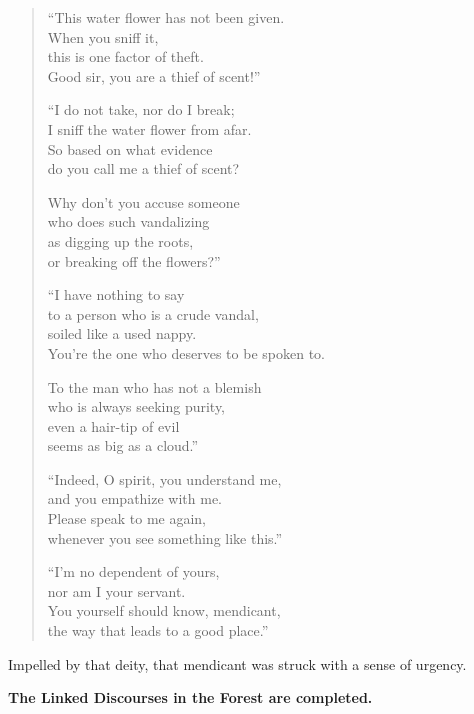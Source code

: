 \documentclass[12pt,openany]{book}%
\let\oldcontentsline\contentsline
\newcommand{\nopagecontentsline}[3]{\oldcontentsline{#1}{#2}{}}
\newcommand*{\scendkanda}[1]{\begin{Center}\textbf{#1}\end{Center}\addvspace{1em}} %
\begin{document}
\begin{verse}%
“This water flower has not been given. \\
When you sniff it, \\
this is one factor of theft. \\
Good sir, you are a thief of scent!” 

“I do not take, nor do I break; \\
I sniff the water flower from afar. \\
So based on what evidence \\
do you call me a thief of scent? 

Why don’t you accuse someone \\
who does such vandalizing \\
as digging up the roots, \\
or breaking off the flowers?” 

“I have nothing to say \\
to a person who is a crude vandal, \\
soiled like a used nappy. \\
You’re the one who deserves to be spoken to. 

To the man who has not a blemish \\
who is always seeking purity, \\
even a hair-tip of evil \\
seems as big as a cloud.” 

“Indeed, O spirit, you understand me, \\
and you empathize with me. \\
Please speak to me again, \\
whenever you see something like this.” 

“I’m no dependent of yours, \\
nor am I your servant. \\
You yourself should know, mendicant, \\
the way that leads to a good place.” 

%
\end{verse}

Impelled by that deity, that mendicant was struck with a sense of urgency. 

\scendkanda{The Linked Discourses in the Forest are completed. }

%
\end{document}
